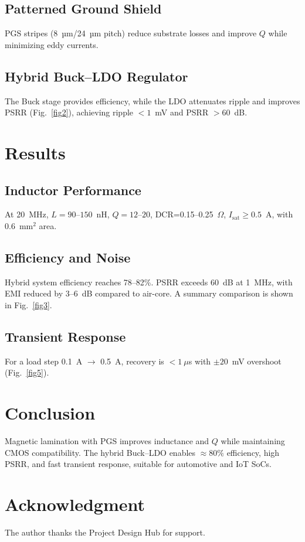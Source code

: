 \documentclass[conference]{IEEEtran}
\begin{document}
\subsection{Patterned Ground Shield}
PGS stripes (8~µm/24~µm pitch) reduce substrate losses and improve $Q$ while minimizing eddy currents.

\subsection{Hybrid Buck--LDO Regulator}
The Buck stage provides efficiency, while the LDO attenuates ripple and improves PSRR (Fig.~\ref{fig2}), achieving ripple $<1$~mV and PSRR $>60$~dB.

\section{Results}
\subsection{Inductor Performance}
At 20~MHz, $L=90$--$150$~nH, $Q=12$--$20$, DCR=0.15--0.25~$\Omega$, $I_\mathrm{sat}\geq0.5$~A, with 0.6~mm$^2$ area.

\subsection{Efficiency and Noise}
Hybrid system efficiency reaches 78--82\%. PSRR exceeds 60~dB at 1~MHz, with EMI reduced by 3--6~dB compared to air-core. A summary comparison is shown in Fig.~\ref{fig3}.

\subsection{Transient Response}
For a load step 0.1~A $\to$ 0.5~A, recovery is $<1~\mu$s with $\pm 20$~mV overshoot (Fig.~\ref{fig5}).

\section{Conclusion}
Magnetic lamination with PGS improves inductance and $Q$ while maintaining CMOS compatibility. The hybrid Buck--LDO enables $\approx 80\%$ efficiency, high PSRR, and fast transient response, suitable for automotive and IoT SoCs.

\section*{Acknowledgment}
The author thanks the Project Design Hub for support.
\end{document}
